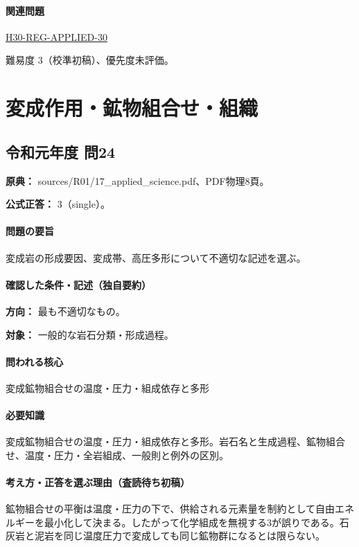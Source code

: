 \paragraph{関連問題} \hyperref[q:h30-reg-applied-30]{H30-REG-APPLIED-30}

\par 難易度 3（校準初稿）、優先度未評価。

\section{変成作用・鉱物組合せ・組織}

\subsection{令和元年度 問24}
\label{q:r01-reg-applied-24}

\noindent\textbf{原典：} sources/R01/17\_applied\_science.pdf、PDF物理8頁。

\textbf{公式正答：} 3（single）。

\paragraph{問題の要旨} 変成岩の形成要因、変成帯、高圧多形について不適切な記述を選ぶ。

\paragraph{確認した条件・記述（独自要約）}\mbox{}\par

\noindent\textbf{方向：} 最も不適切なもの。\par

\noindent\textbf{対象：} 一般的な岩石分類・形成過程。\par

\paragraph{問われる核心} 変成鉱物組合せの温度・圧力・組成依存と多形

\paragraph{必要知識} 変成鉱物組合せの温度・圧力・組成依存と多形。岩石名と生成過程、鉱物組合せ、温度・圧力・全岩組成、一般則と例外の区別。

\paragraph{考え方・正答を選ぶ理由（査読待ち初稿）} 鉱物組合せの平衡は温度・圧力の下で、供給される元素量を制約として自由エネルギーを最小化して決まる。したがって化学組成を無視する3が誤りである。石灰岩と泥岩を同じ温度圧力で変成しても同じ鉱物群になるとは限らない。

